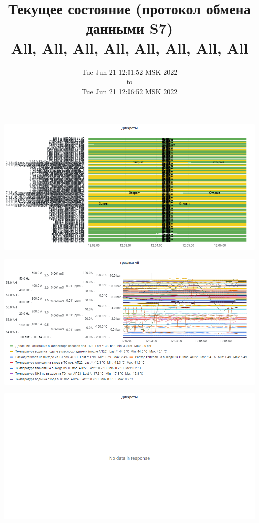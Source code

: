 \documentclass{article}
\begin{document}
\title{Текущее состояние (протокол обмена данными S7)  \\ \large All, All, All, All, All, All, All, All  }
\date{Tue Jun 21 12:01:52 MSK 2022\\to\\Tue Jun 21 12:06:52 MSK 2022}
\maketitle
\begin{center}
\par
\vspace{0.5cm}
\includegraphics[width=\textwidth]{image15}
\par
\vspace{0.5cm}
\par
\vspace{0.5cm}
\includegraphics[width=\textwidth]{image12}
\par
\vspace{0.5cm}
\par
\vspace{0.5cm}
\includegraphics[width=\textwidth]{image154}

\end{center}
\end{document}
